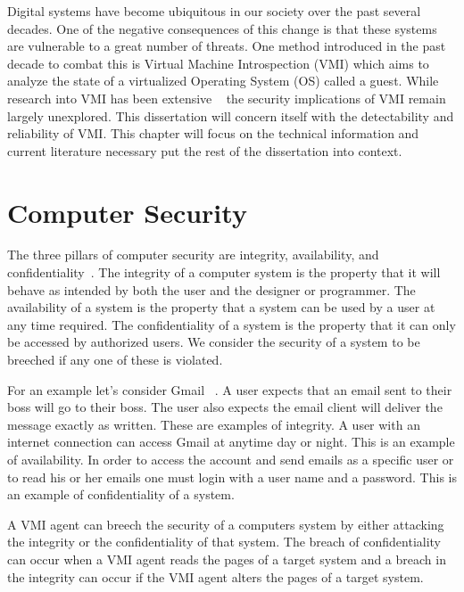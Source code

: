 
Digital systems have become ubiquitous in our society over the past several decades. One of the negative consequences of this change is that these systems are vulnerable to a great number of threats. One method introduced in the past decade to combat this is Virtual Machine Introspection (VMI) which aims to analyze the state of a virtualized Operating System (OS) called a guest. While research into VMI has been extensive ~\cite{bahram_dksm:_2010,pfoh_exploiting_2010,dolan-gavitt_leveraging_2011,dolan-gavitt_virtuoso:_2011,gu_process_2011-1,fu_bridging_2013,garfinkel_virtual_2003,hay_forensics_2008} the security implications of VMI remain largely unexplored. This dissertation will concern itself with the detectability and reliability of VMI. This chapter will focus on the technical information and current literature necessary put the rest of the dissertation into context. 

\section{Computer Security}

The three pillars of computer security are integrity, availability, and confidentiality~\cite{bishop_computer_2012}.  The integrity of a computer system is the property that it will behave as intended by both the user and the designer or programmer.  The availability of a system is the property that a system can be used by a user at any time required. The confidentiality of a system is the property that it can only be accessed by authorized users.  We consider the security of a system to be breeched if any one of these is violated. 

For an example let's consider Gmail ~\cite{gmail2015}.  A user expects that an email sent to their boss will go to their boss. The user also expects the email client will deliver the message exactly as written. These are examples of integrity. A user with an internet connection can access Gmail at anytime day or night. This is an example of availability. In order to access the account and send emails as a specific user or to read his or her emails one must login with a user name and a password.  This is an example of confidentiality of a system. 

A VMI agent can breech the security of a computers system by either attacking the integrity or the confidentiality of that system. The breach of confidentiality can occur when a VMI agent reads the pages of a target system and a breach in the integrity can occur if the VMI agent alters the pages of a target system. 

